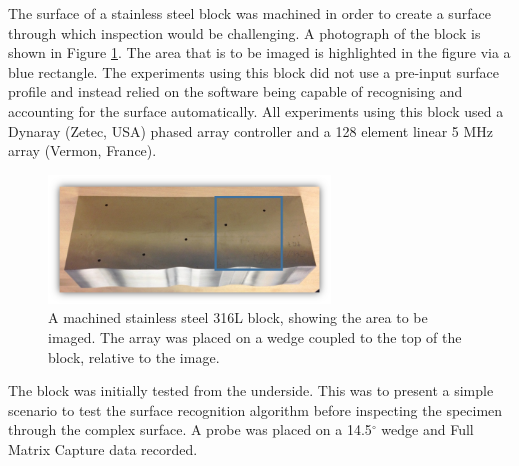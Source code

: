 The surface of a stainless steel block was machined in order to create a surface through which inspection would be challenging. A photograph of the block is shown in Figure \ref{fig:ailidh1}. The area that is to be imaged is highlighted in the figure via a blue rectangle. The experiments using this block did not use a pre-input surface profile and instead relied on the software being capable of recognising and accounting for the surface automatically\cite{mcgilp_inspection_2015}. All experiments using this block used a Dynaray (Zetec, USA) phased array controller and a 128 element linear 5 MHz array (Vermon, France).

\begin{figure}[htbp!]
\centering
		\includegraphics[width=75mm]{ailidh1-new.png}
		\caption{A machined stainless steel 316L block, showing the area to be imaged. The array was placed on a wedge coupled to the top of the block, relative to the image.}
		\label{fig:ailidh1}
\end{figure}

The block was initially tested from the underside. This was to present a simple scenario to test the surface recognition algorithm before inspecting the specimen through the complex surface. A probe was placed on a 14.5$^\circ$ wedge and Full Matrix Capture data recorded.


